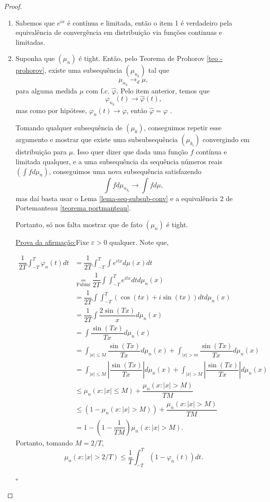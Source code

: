 \documentclass[12pt,a4paper,oneside]{book}
\newenvironment{claim}[1]{\par\noindent\underline{Afirma\c{c}\~ao:}\space#1}{}
\newenvironment{claimproof}[1]{\par\noindent\underline{Prova da afirma\c{c}\~ao:}\space#1}{\hfill $\square$}
\theoremstyle{definition}
\theoremstyle{remark}
\numberwithin{equation}{section}
\newcommand{\e}{\varepsilon}
\begin{document}
\begin{proof}$ $

\begin{enumerate}

\item Sabemos que $e^{ix}$ é contínua e limitada, então o item 1 é verdadeiro pela equivalência de convergência em distribuição via funções continuas e limitadas. 

\item  Suponha que $(\mu_n)$ é tight. Então, pelo Teorema de Prohorov \ref{teo - prohorov}, existe uma subsequência $(\mu_{n_k})$ tal que
$$\mu_{n_k} \rightarrow_d \mu, $$
para alguma medida $\mu$ com f.c. $\hat{\varphi}.$
Pelo item anterior, temos que 
$$\varphi_{n_k}(t) \rightarrow \hat{\varphi}(t),  $$
mas como por hipótese, $\varphi_n(t)\rightarrow \varphi$, então
$\hat{\varphi} = \varphi$ .

Tomando qualquer subsequência de $(\mu_{k})$, conseguimos repetir esse argumento e mostrar que existe uma subsubsequência  $(\mu_{k_l})$ convergindo em distribuição para $\mu.$ Isso quer dizer que dada uma função $f$ contínua e limitada qualquer, e a uma subsequência da sequência números reais $(\int f d\mu_{n})$, conseguimos uma nova subsequência satisfazendo
$$\int f d\mu_{n_{k_l}} \rightarrow \int fd\mu,  $$
mas daí basta usar o Lema \ref{lema-seq-subsub-conv} e a equivalência 2 de Portemanteau \ref{teorema portmanteau}.

Portanto, só nos falta mostrar que de fato $(\mu_n)$ é tight.
\bigskip
{}
\begin{claimproof}
Fixe $\e>0$ qualquer. Note que,

\begin{align*}
\dfrac{1}{2T}\int_{-T}^T \varphi_n(t)dt & = \dfrac{1}{2T}\int_{-T}^T \int e^{itx}d\mu(x)dt\\
& \underset{\text{Fubini}}{=} \dfrac{1}{2T} \int\int_{-T}^T e^{itx}dtd\mu_n(x)\\
& = \dfrac{1}{2T} \int\int_{-T}^T (\cos(tx) + i\sin(tx))dtd\mu_n(x)\\
& = \dfrac{1}{2T} \int\dfrac{ 2\sin(Tx)}{x} d\mu_n(x)\\
& =  \int\dfrac{ \sin(Tx)}{Tx} d\mu_n(x)\\
& =  \int_{|x|\leq M}\dfrac{ \sin(Tx)}{Tx} d\mu_n(x)+  \int_{|x|>m}\dfrac{ \sin(Tx)}{Tx} d\mu_n(x)\\
& =  \int_{|x|\leq M} \left| \dfrac{ \sin(Tx)}{Tx}\right| d\mu_n(x)+  \int_{|x|>M}\left|\dfrac{ \sin(Tx)}{Tx}\right| d\mu_n(x)\\
& \leq \mu_n(x:|x|\leq M) + \dfrac{\mu_n(x:|x|>M)}{TM}\\
& \leq (1-\mu_n(x:|x|> M)) + \dfrac{\mu_n(x:|x|>M)}{TM}\\
& =  1 -\left(1- \dfrac{1}{TM}\right)\mu_n(x:|x|>M).
\end{align*}
Portanto, tomando $M= 2/T$,
$$\mu_n(x:|x|>2/T)\leq \dfrac{1}{T}\int_{-T}^T (1-\varphi_n(t))dt.   $$


\end{claimproof}
\end{enumerate}
\end{proof}
\end{document}
